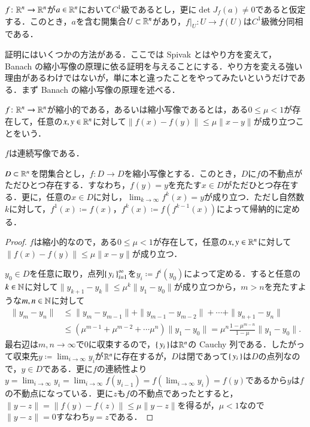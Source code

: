 \begin{thm}[逆関数定理]\label{逆関数定理}
$f \colon \mathbb{R}^n \to \mathbb{R}^n$が$a \in \mathbb{R}^n$において$C^1$級であるとし，更に$\det J_f(a) \neq 0$であると仮定する．このとき，$a$を含む開集合$U \subset \mathbb{R}^n$があり，$f|_U \colon U \to f(U)$は$C^1$級微分同相である．
\end{thm}

証明にはいくつかの方法がある．ここでは Spivak とはやり方を変えて， Banach の縮小写像の原理に依る証明を与えることにする．やり方を変える強い理由があるわけではないが，単に本と違ったことをやってみたいというだけである．まず Banach の縮小写像の原理を述べる．

\begin{defi}[縮小写像]
$f \colon \mathbb{R}^n \to \mathbb{R}^n$が縮小的である，あるいは縮小写像であるとは，ある$0 \leq \mu < 1$が存在して，任意の$x, y \in \mathbb{R}^n$に対して$\|f(x) - f(y)\| \leq \mu \|x-y\|$が成り立つことをいう．
\end{defi}

\begin{que}
$f$は連続写像である．
\end{que}

\begin{thm}
$D \subset \mathbb{R}^n$を閉集合とし，$f \colon D \to D$を縮小写像とする．このとき，$D$に$f$の不動点がただひとつ存在する．すなわち，$f(y)=y$を充たす$x \in D$がただひとつ存在する．更に，任意の$x \in D$に対し，$\lim_{k \to \infty} f^k(x)=y$が成り立つ．ただし自然数$k$に対して，$f^1(x) \coloneqq f(x)$，$f^k(x) \coloneqq f(f^{k-1}(x))$によって帰納的に定める．
\end{thm}

\begin{proof}
$f$は縮小的なので，ある$0 \leq \mu < 1$が存在して，任意の$x, y \in \mathbb{R}^n$に対して$\|f(x) - f(y)\| \leq \mu \|x-y\|$が成り立つ．

$y_0 \in D$を任意に取り，点列$\set{y_i}_{i=1}^\infty$を$y_i \coloneqq f^{i}(y_0)$によって定める．すると任意の$k \in \mathbb{N}$に対して$\|y_{k+1} - y_k\| \leq \mu^k\|y_1 - y_0\|$が成り立つから，$m>n$を充たすような$m,n \in \mathbb{N}$に対して
\begin{align}
\|y_m - y_n\| &\leq \|y_m - y_{m-1}\| + \|y_{m-1} - y_{m-2}\| + \cdots + \|y_{n+1} - y_{n}\| \\
& \leq (\mu^{m-1} + \mu^{m-2} + \cdots \mu^{n})  \|y_1 - y_0\| = \mu^{n} \frac{1 - \mu^{m-n}}{1 - \mu}\|y_1 - y_0\|.
\end{align}最右辺は$m,n \to \infty$で0に収束するので，$\set{y_i}$は$\mathbb{R}^n$の Cauchy 列である．したがって収束先$y \coloneqq \lim_{i \to \infty} y_i$が$\mathbb{R}^n$に存在するが，$D$は閉であって$\set{y_i}$は$D$の点列なので，$y \in D$である．更に$f$の連続性より$y = \lim_{i \to \infty} y_i = \lim_{i \to \infty} f(y_{i-1}) = f(\lim_{i \to \infty} y_i) = f(y)$であるから$y$は$f$の不動点になっている．更に$z$も$f$の不動点であったとすると，$\|y - z\| = \|f(y) - f(z)\| \leq \mu \|y-z\|$を得るが，$\mu < 1$なので$\|y-z\|=0$すなわち$y=z$である．
\end{proof}

